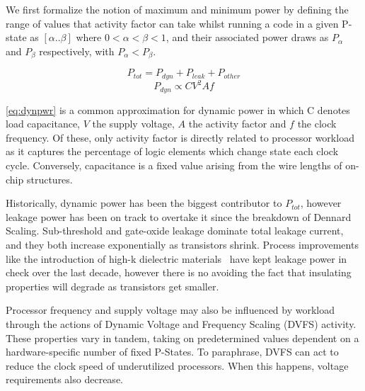 We first formalize the notion of maximum and minimum power by defining the range of values that activity factor can take whilst running a code in a given P-state as $[\alpha  .. \beta]$ where $0 < \alpha < \beta < 1$, and their associated power draws as $P_{\alpha}$ and $P_{\beta}$ respectively, with $P_{\alpha} < P_{\beta}$. 








\begin{equation}
\label{eq:totpwr}
P_{tot} = P_{dyn} + P_{leak} + P_{other}
\end{equation}
\begin{equation} 
\label{eq:dynpwr}
P_{dyn} \propto CV^{2}Af
\end{equation}

\autoref{eq:dynpwr} is a common approximation for dynamic power in which C denotes load capacitance, $V$ the supply voltage, $A$ the activity factor and $f$ the clock frequency.
Of these, only activity factor is directly related to processor workload as it captures the percentage of logic elements which change state each clock cycle.
Conversely, capacitance is a fixed value arising from the wire lengths of on-chip structures.


Historically, dynamic power has been the biggest contributor to $P_{tot}$, however leakage power has been on track to overtake it since the breakdown of Dennard Scaling.  Sub-threshold and gate-oxide leakage dominate total leakage current, and they both increase exponentially as transistors shrink. Process improvements like the introduction of high-k dielectric materials~\cite{jan:2009aa} have kept leakage power in check over the last decade, however there is no avoiding the fact that insulating properties will degrade as transistors get smaller.

Processor frequency and supply voltage may also be influenced by workload through the actions of Dynamic Voltage and Frequency Scaling (DVFS) activity.
These properties vary in tandem, taking on predetermined values dependent on a hardware-specific number of fixed P-States.
To paraphrase, DVFS can act to reduce the clock speed of underutilized processors. When this happens, voltage requirements also decrease.

